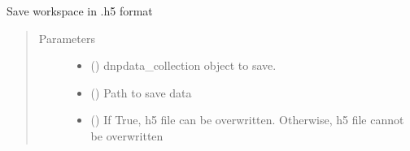\documentclass[letterpaper,10pt,english]{sphinxmanual}
\begin{document}
\begin{fulllineitems}
\label{\detokenize{dnpImport:dnpLab.dnpImport.h5.saveh5}}
Save workspace in .h5 format
\begin{quote}\begin{description}
\item[{Parameters}] \leavevmode\begin{itemize}
\item {} 
 ({\hyperref[\detokenize{dnpData:dnpLab.dnpdata_collection}]{}}) \sphinxhyphen{}\sphinxhyphen{} dnpdata\_collection object to save.

\item {} 
 () \sphinxhyphen{}\sphinxhyphen{} Path to save data

\item {} 
 () \sphinxhyphen{}\sphinxhyphen{} If True, h5 file can be overwritten. Otherwise, h5 file cannot be overwritten

\end{itemize}

\end{description}\end{quote}

\end{fulllineitems}

\end{document}
